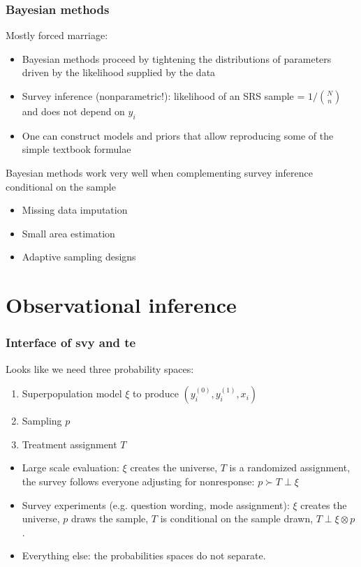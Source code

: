 \documentclass[handout]{beamer}
\begin{document}
\begin{frame}\frametitle{Bayesian methods}

Mostly forced marriage:
\begin{itemize}
    \item Bayesian methods proceed by tightening the distributions of parameters
        driven by the likelihood supplied by the data
    \item Survey inference (nonparametric!): likelihood of an SRS sample = $1/{N \choose n}$ and does not depend on $y_i$
    \item One can construct models and priors that allow reproducing some of the simple
        textbook formulae \citep{little:2012}
\end{itemize}

Bayesian methods work very well when complementing survey inference conditional on the sample
\begin{itemize}
    \item Missing data imputation
    \item Small area estimation
    \item Adaptive sampling designs
\end{itemize}

\end{frame}




\section{Observational inference}

\begin{frame}\frametitle{Interface of svy and te}

Looks like we need three probability spaces:
\begin{enumerate}
	\item Superpopulation model $\xi$ to produce $(y^{(0)}_i, y^{(1)}_i, x_i)$
	\item Sampling $p$
	\item Treatment assignment $T$
\end{enumerate}


\begin{itemize}
   \item Large scale evaluation: $\xi$ creates the universe, $T$ is a randomized assignment,
           the survey follows everyone adjusting for nonresponse: $p \succ T \perp \xi$
   \item Survey experiments (e.g. question wording, mode assignment): $\xi$ creates the universe,
           $p$ draws the sample, $T$ is conditional on the sample drawn, $T \perp \xi \otimes p$. 
   \item Everything else: the probabilities spaces do not separate.
\end{itemize}

\end{frame}
\end{document}
